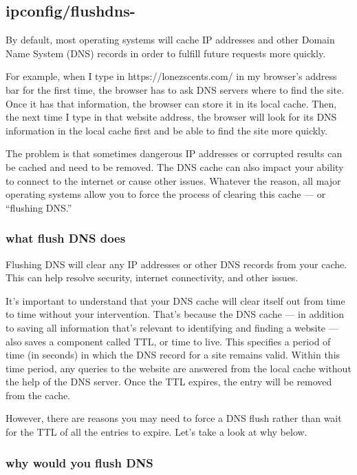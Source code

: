 \documentclass[a4paper,12pt]{book}
\begin{document}
\subsection{ipconfig/flushdns-}

By default, most operating systems will cache IP addresses and other Domain Name System (DNS) records in order to fulfill future requests more quickly.

For example, when I type in https://lonezscents.com/ in my browser’s address bar for the first time, the browser has to ask DNS servers where to find the site. Once it has that information, the browser can store it in its local cache. Then, the next time I type in that website address, the browser will look for its DNS information in the local cache first and be able to find the site more quickly.

The problem is that sometimes dangerous IP addresses or corrupted results can be cached and need to be removed. The DNS cache can also impact your ability to connect to the internet or cause other issues. Whatever the reason, all major operating systems allow you to force the process of clearing this cache — or “flushing DNS.”

\subsubsection{what flush DNS does}
Flushing DNS will clear any IP addresses or other DNS records from your cache. This can help resolve security, internet connectivity, and other issues.

It’s important to understand that your DNS cache will clear itself out from time to time without your intervention. That’s because the DNS cache — in addition to saving all information that’s relevant to identifying and finding a website — also saves a component called TTL, or time to live. This specifies a period of time (in seconds) in which the DNS record for a site remains valid. Within this time period, any queries to the website are answered from the local cache without the help of the DNS server. Once the TTL expires, the entry will be removed from the cache.

However, there are reasons you may need to force a DNS flush rather than wait for the TTL of all the entries to expire. Let’s take a look at why below.

\subsubsection{why would you flush DNS}
\end{document}
